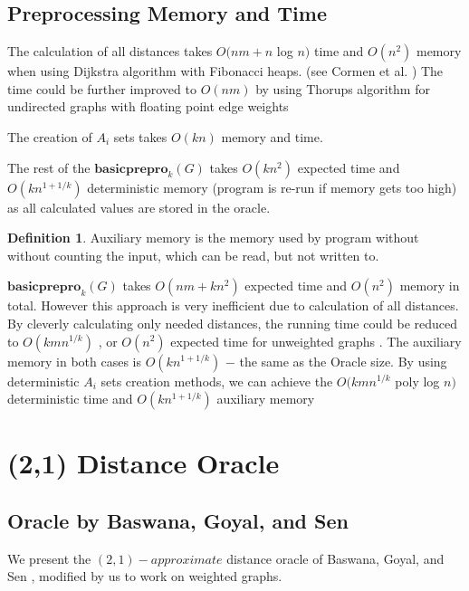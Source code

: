\documentclass[shortabstract, lic, english]{iithesis}
\theoremstyle{definition} \newtheorem{definition}{Definition}[chapter]
\theoremstyle{plain} \newtheorem{remark}[definition]{Observation}
\theoremstyle{plain} \newtheorem{theorem}[definition]{Theorem}
\theoremstyle{plain} \newtheorem{lemma}[definition]{Lemma}
\theoremstyle{plain} \newtheorem{conjecture}[definition]{Conjecture}
\begin{document}
\section{Preprocessing Memory and Time}

The calculation of all distances takes $O(nm + n $ log $n)$ time and $O(n^2)$ memory
when using Dijkstra algorithm with Fibonacci heaps. (see Cormen et al. \cite[Chapter 21]{cormen})
The time could be further improved to $O(nm)$ by using Thorups algorithm for undirected graphs with floating point edge weights \cite{uberDijkstraInt, uberDijkstraFloat}

The creation of $A_i$ sets takes $O(kn)$ memory and time.

The rest of the $\mathbf{basicprepro}_k(G)$ takes $O(kn^2)$ expected time and 
$O(kn^{1 + 1/k})$ deterministic memory (program is re-run if memory gets too high)
as all calculated values are stored in the oracle.

\begin{definition}
    Auxiliary memory is the memory used by program without without counting the input, which can be read, but not written to.
\end{definition}

$\mathbf{basicprepro}_k(G)$ takes $O(nm + kn^2)$ expected time and $O(n^2)$ memory in total.
However this approach is very inefficient due to calculation of all distances. By cleverly calculating only needed distances,
the running time could be reduced to $O(kmn^{1/k})$ \cite{21OracleBasic}, or $O(n^2)$ expected time for unweighted graphs \cite{a0OraclesN2Time}.
The auxiliary memory in both cases is $O(kn^{1 + 1/k})$ $-$ the same as the Oracle size.
By using deterministic $A_i$ sets creation methods,
we can achieve the $O(kmn^{1/k} $ poly log $n)$ deterministic time and $O(kn^{1 + 1/k})$ auxiliary memory \cite{a0OraclesMN1KDeterministicTime}


\chapter{(2,1) Distance Oracle} \label{21DistanceOracle}

\section{Oracle by Baswana, Goyal, and Sen}

We present the $(2,1)-approximate$ distance oracle of Baswana, Goyal, and Sen \cite{21OracleBasic},
modified by us to work on weighted graphs.
\end{document}
